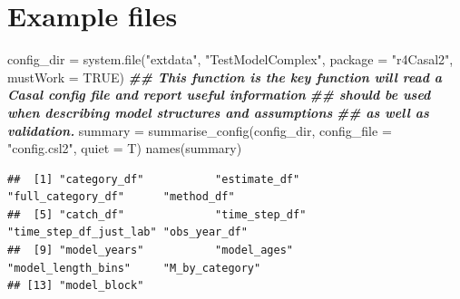 \documentclass[
]{book}
\newenvironment{Shaded}{\begin{snugshade}}{\end{snugshade}}
\newcommand{\AttributeTok}[1]{\textcolor[rgb]{0.77,0.63,0.00}{#1}}
\newcommand{\ConstantTok}[1]{\textcolor[rgb]{0.00,0.00,0.00}{#1}}
\newcommand{\DocumentationTok}[1]{\textcolor[rgb]{0.56,0.35,0.01}{\textbf{\textit{#1}}}}
\newcommand{\FloatTok}[1]{\textcolor[rgb]{0.00,0.00,0.81}{#1}}
\newcommand{\FunctionTok}[1]{\textcolor[rgb]{0.00,0.00,0.00}{#1}}
\newcommand{\NormalTok}[1]{#1}
\newcommand{\OtherTok}[1]{\textcolor[rgb]{0.56,0.35,0.01}{#1}}
\newcommand{\SpecialCharTok}[1]{\textcolor[rgb]{0.00,0.00,0.00}{#1}}
\newcommand{\StringTok}[1]{\textcolor[rgb]{0.31,0.60,0.02}{#1}}
\begin{document}
\hypertarget{example-files}{%
\section{Example files}\label{example-files}}

\begin{Shaded}
\begin{Highlighting}[]
\NormalTok{config\_dir }\OtherTok{=} \FunctionTok{system.file}\NormalTok{(}\StringTok{"extdata"}\NormalTok{, }\StringTok{"TestModelComplex"}\NormalTok{, }\AttributeTok{package =} \StringTok{"r4Casal2"}\NormalTok{, }\AttributeTok{mustWork =} \ConstantTok{TRUE}\NormalTok{)}
\DocumentationTok{\#\# This function is the key function will read a Casal config file and report useful information}
\DocumentationTok{\#\# should be used when describing model structures and assumptions}
\DocumentationTok{\#\# as well as validation.}
\NormalTok{summary }\OtherTok{=} \FunctionTok{summarise\_config}\NormalTok{(config\_dir, }\AttributeTok{config\_file =} \StringTok{"config.csl2"}\NormalTok{, }\AttributeTok{quiet =}\NormalTok{ T)}
\FunctionTok{names}\NormalTok{(summary)}
\end{Highlighting}
\end{Shaded}

\begin{verbatim}
##  [1] "category_df"           "estimate_df"           "full_category_df"      "method_df"            
##  [5] "catch_df"              "time_step_df"          "time_step_df_just_lab" "obs_year_df"          
##  [9] "model_years"           "model_ages"            "model_length_bins"     "M_by_category"        
## [13] "model_block"
\end{verbatim}

\begin{Shaded}
\end{Shaded}
\end{document}
